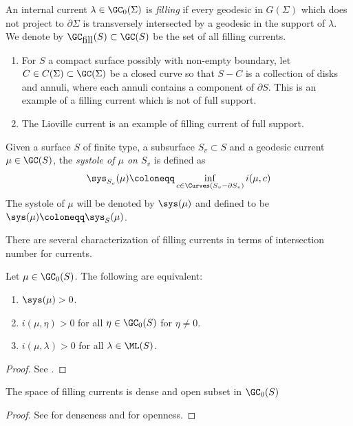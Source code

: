 \begin{definition}
  An internal current $\lambda \in \GC_0(\Sigma)$ is \emph{filling} if every geodesic in $G(\Sigma)$ which does not project to $\partial \Sigma$ is transversely intersected by a geodesic in the support of $\lambda$. We denote by $\GC_{\mbox{fill}}(S) \subset \GC(S)$ be the set of all filling currents.
\end{definition}

\begin{example}
\begin{enumerate}
    \item For $S$ a compact surface possibly with non-empty boundary, let $C \in C(\Sigma) \subset \GC(\Sigma)$ be a closed curve so that $S - C$ is a collection of disks and annuli, where each annuli contains a component of $\partial S$. This is an example of a filling current which is not of full support.
    \item The Lioville current is an example of filling current of full support.
\end{enumerate}
\end{example}

Given a surface $S$ of finite type, a subsurface $S_v \subset S$ and a geodesic current $\mu \in \GC(S)$, the \emph{systole of $\mu$ on $S_v$} is defined as
\[
  \sys_{S_v}(\mu) \coloneqq \inf_{c \in \Curves(S_v-\partial S_v)} i(\mu,c)
\]
The systole of $\mu$ will be denoted by $\sys(\mu)$ and defined to be $\sys(\mu) \coloneqq \sys_{S}(\mu)$.

There are several characterization of filling currents in terms of intersection number for currents.

\begin{proposition}
   Let $\mu \in \GC_0(S)$.
   The following are equivalent:
   \begin{enumerate}
       \item $\sys(\mu)>0$.
       \item $i(\mu,\eta)>0$ for all $\eta \in \GC_0(S)$ for $\eta \neq 0$.
       \item $i(\mu,\lambda) > 0$ for all $\lambda\in \ML(S)$.
   \end{enumerate}
   \label{prop:filling}
\end{proposition}
\begin{proof}
  See \cite[Theorem~4.1]{BIPP17:Structure}.
\end{proof}

\begin{proposition}
  The space of filling currents is dense and open subset in $\GC_0(S)$
\end{proposition}
\begin{proof}
  See \cite[Lemma~3.6]{EM18:ErgodicGeodesicCurrents} for denseness and \cite[Corollary~3.8]{EM18:ErgodicGeodesicCurrents} for openness.
\end{proof}

